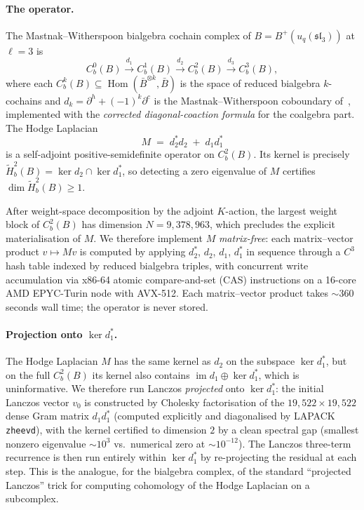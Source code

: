 \documentclass[11pt,letterpaper]{amsart}
\theoremstyle{plain}
\theoremstyle{definition}
\theoremstyle{remark}
\begin{document}
\paragraph{The operator.}
The Mastnak--Witherspoon bialgebra cochain complex of $B = B^+(u_q(\mathfrak{sl}_3))$ at $\ell = 3$ is
\[
C^0_b(B) \xrightarrow{d_1} C^1_b(B) \xrightarrow{d_2} C^2_b(B) \xrightarrow{d_3} C^3_b(B),
\]
where each $C^k_b(B) \subseteq \operatorname{Hom}(\bar B^{\otimes k}, \bar B)$ is the space of reduced bialgebra $k$-cochains and $d_k = \partial^h + (-1)^k \partial^c$ is the Mastnak--Witherspoon coboundary of~\cite[\S 2.1]{MW08}, implemented with the \emph{corrected diagonal-coaction formula} for the coalgebra part. The Hodge Laplacian
\[
M \;=\; d_2^* d_2 \;+\; d_1 d_1^*
\]
is a self-adjoint positive-semidefinite operator on $C^2_b(B)$. Its kernel is precisely $\tilde{H}^2_b(B) = \ker d_2 \cap \ker d_1^*$, so detecting a zero eigenvalue of $M$ certifies $\dim \tilde{H}^2_b(B) \geq 1$.

After weight-space decomposition by the adjoint $K$-action, the largest weight block of $C^2_b(B)$ has dimension $N = 9{,}378{,}963$, which precludes the explicit materialisation of $M$. We therefore implement $M$ \emph{matrix-free}: each matrix--vector product $v \mapsto Mv$ is computed by applying $d_2^*$, $d_2$, $d_1$, $d_1^*$ in sequence through a $C^3$ hash table indexed by reduced bialgebra triples, with concurrent write accumulation via x86-64 atomic compare-and-set (CAS) instructions on a 16-core AMD EPYC-Turin node with AVX-512. Each matrix--vector product takes $\sim 360$ seconds wall time; the operator is never stored.

\paragraph{Projection onto $\ker d_1^*$.}
The Hodge Laplacian $M$ has the same kernel as $d_2$ on the subspace $\ker d_1^*$, but on the full $C^2_b(B)$ its kernel also contains $\operatorname{im} d_1 \oplus \ker d_1^*$, which is uninformative. We therefore run Lanczos \emph{projected} onto $\ker d_1^*$: the initial Lanczos vector $v_0$ is constructed by Cholesky factorisation of the $19{,}522 \times 19{,}522$ dense Gram matrix $d_1 d_1^*$ (computed explicitly and diagonalised by LAPACK \texttt{zheevd}), with the kernel certified to dimension $2$ by a clean spectral gap (smallest nonzero eigenvalue $\sim 10^3$ vs.\ numerical zero at $\sim 10^{-12}$). The Lanczos three-term recurrence is then run entirely within $\ker d_1^*$ by re-projecting the residual at each step. This is the analogue, for the bialgebra complex, of the standard ``projected Lanczos'' trick for computing cohomology of the Hodge Laplacian on a subcomplex.
\end{document}
